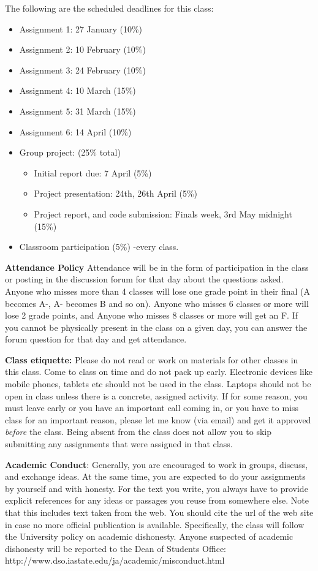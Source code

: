 \documentclass[11pt,a4paper]{article}
\begin{document}
The following are the scheduled deadlines for this class: %
\begin{itemize}
\item Assignment 1: 27 January (10\%)
\item Assignment 2: 10 February (10\%)
\item Assignment 3: 24 February (10\%)
\item Assignment 4: 10 March (15\%)
\item Assignment 5: 31 March (15\%)
\item Assignment 6: 14 April (10\%)
\item Group project: (25\% total)
\begin{itemize}
\item Initial report due: 7 April (5\%)
\item Project presentation: 24th, 26th April (5\%)
\item Project report, and code submission: Finals week, 3rd May midnight (15\%)
\end{itemize}
\item Classroom participation (5\%) -every class. 
\end{itemize}

\bigskip\textbf{\large Attendance Policy}
Attendance will be in the form of participation in the class or posting in the discussion forum for that day about the questions asked. Anyone who misses more than 4 classes will lose one grade point in their final (A becomes A-, A- becomes B and so on). Anyone who misses 6 classes or more will lose 2 grade points, and Anyone who misses 8 classes or more will get an F. If you cannot be physically present in the class on a given day, you can answer the forum question for that day and get attendance.

\bigskip\textbf{\large Class etiquette:} Please do not read or work on materials for other classes in this class. Come to class on time and do not pack up early. Electronic devices like mobile phones, tablets etc should not be used in the class. Laptops should not be open in class unless there is a concrete, assigned activity. If for some reason, you must leave early or you have an important call coming in, or you have to miss class for an important reason, please let me know (via email) and get it approved \emph{before} the class. Being absent from the class does not allow you to skip submitting any assignments that were assigned in that class.

\bigskip\textbf{\large Academic Conduct}: Generally, you are encouraged to work in groups, discuss, and exchange ideas. At the same time, you are expected to do your assignments by yourself and with honesty. For the text you write, you always have to provide explicit references for any ideas or passages you reuse from somewhere else. Note that this includes text taken from the web. You should cite the url of the web site in case no more official publication is available. Specifically, the class will follow the University policy on academic dishonesty. Anyone suspected of academic dishonesty will be reported to the Dean of Students Office: http://www.dso.iastate.edu/ja/academic/misconduct.html
\end{document}
